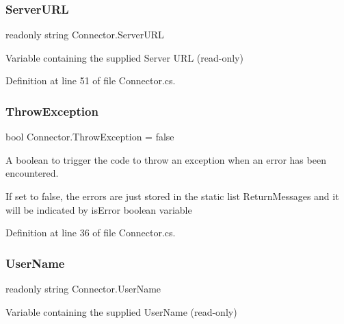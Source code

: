 \mbox{\label{class_connector_ac0cae400459978dde8030f75208e48f1}} 
\subsubsection{\texorpdfstring{Server\+U\+RL}{ServerURL}}
{\footnotesize\ttfamily readonly string Connector.\+Server\+U\+RL}



Variable containing the supplied Server U\+RL (read-\/only) 



Definition at line 51 of file Connector.\+cs.

\mbox{\label{class_connector_a8ec0dcdbb4a85a56fa50f67686484c19}} 
\subsubsection{\texorpdfstring{Throw\+Exception}{ThrowException}}
{\footnotesize\ttfamily bool Connector.\+Throw\+Exception = false\hspace{0.3cm}{\ttfamily [static]}}



A boolean to trigger the code to throw an exception when an error has been encountered. 

If set to false, the errors are just stored in the static list Return\+Messages and it will be indicated by is\+Error boolean variable

Definition at line 36 of file Connector.\+cs.

\mbox{\label{class_connector_a41d247f09774f0ed206ce1a4a2463fed}} 
\subsubsection{\texorpdfstring{User\+Name}{UserName}}
{\footnotesize\ttfamily readonly string Connector.\+User\+Name}



Variable containing the supplied User\+Name (read-\/only) 



